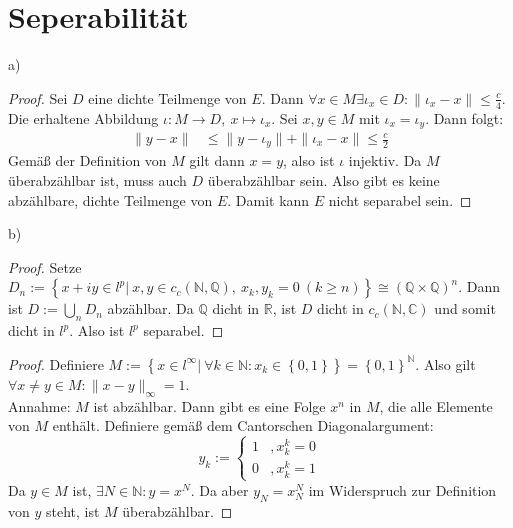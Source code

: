 \documentclass[a4paper,12pt]{article}
\newcommand{\kla}{}
\newcommand{\klammer}{}
\begin{document}
\section{Seperabilität}
a)
\begin{proof}
Sei $D$ eine dichte Teilmenge von $E$. Dann $\forall x\in M\exists\iota_x\in D:\|\iota_x-x\|\le \frac{c}{4}$. Die erhaltene Abbildung $\iota :M\rightarrow D,\ x\mapsto\iota_x$. Sei $x,y\in M$ mit $\iota_x=\iota_y$. Dann folgt:
\begin{align*}
\|y-x\|&\le\|y-\iota_y\|+\|\iota_x-x\|\le\frac{c}{2}
\end{align*}
Gemäß der Definition von $M$ gilt dann $x=y$, also ist $\iota$ injektiv. Da $M$ überabzählbar ist, muss auch $D$ überabzählbar sein. Also gibt es keine abzählbare, dichte Teilmenge von $E$. Damit kann $E$ nicht separabel sein.
\end{proof}
b)
\begin{proof}
Setze $D_n:=\klammer\left\{ {x+iy\in l^p\vert\ x,y\in c_c(\mathbb{N},\mathbb{Q}),\ x_k,y_k=0\ (k\ge n)} \right\}\cong (\mathbb{Q}\times\mathbb{Q})^n$. Dann ist $D:=\bigcup_nD_n$ abzählbar. Da $\mathbb{Q}$ dicht in $\mathbb{R}$, ist $D$ dicht in $c_c\kla\left( {\mathbb{N},\mathbb{C}} \right)$ und somit dicht in $l^p$. Also ist $l^p$ separabel.
\end{proof}
\begin{proof}
Definiere $M:=\klammer\left\{ {x\in l^\infty\vert\ \forall k\in\mathbb{N}:x_k\in\klammer\left\{ {0,1} \right\}} \right\}=\klammer\left\{ {0,1} \right\}^\mathbb{N}$. Also gilt $\forall x\neq y\in M:\|x-y\|_\infty=1$. \\
Annahme: $M$ ist abzählbar. Dann gibt es eine Folge $x^n$ in $M$, die alle Elemente von $M$ enthält. Definiere gemäß dem Cantorschen Diagonalargument:
$$y_k:=\left\{\begin{matrix}
1 &, x_k^k=0 \\ 0 &, x_k^k=1 
\end{matrix}\right.$$
Da $y\in M$ ist, $\exists N\in\mathbb{N}:y=x^N$. Da aber $y_N=x_N^N$ im Widerspruch zur Definition von $y$ steht, ist $M$ überabzählbar.
\end{proof}
\end{document}
